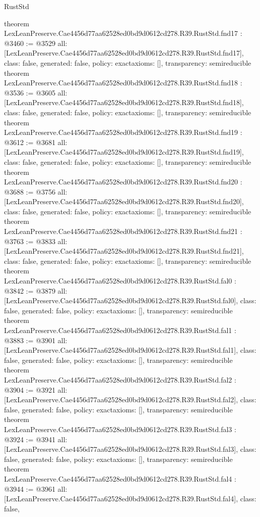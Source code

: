\begin{lexlean}{RustStd}
\begin{coremodule}
theorem LexLeanPreserve.Cae4456d77aa62528ed0bd9d0612cd278.R39.RustStd.fnd17 : @3460 := @3529 {
  all: [LexLeanPreserve.Cae4456d77aa62528ed0bd9d0612cd278.R39.RustStd.fnd17],
  class: false,
  generated: false,
  policy: exact{axioms: []},
  transparency: semireducible
}
theorem LexLeanPreserve.Cae4456d77aa62528ed0bd9d0612cd278.R39.RustStd.fnd18 : @3536 := @3605 {
  all: [LexLeanPreserve.Cae4456d77aa62528ed0bd9d0612cd278.R39.RustStd.fnd18],
  class: false,
  generated: false,
  policy: exact{axioms: []},
  transparency: semireducible
}
theorem LexLeanPreserve.Cae4456d77aa62528ed0bd9d0612cd278.R39.RustStd.fnd19 : @3612 := @3681 {
  all: [LexLeanPreserve.Cae4456d77aa62528ed0bd9d0612cd278.R39.RustStd.fnd19],
  class: false,
  generated: false,
  policy: exact{axioms: []},
  transparency: semireducible
}
theorem LexLeanPreserve.Cae4456d77aa62528ed0bd9d0612cd278.R39.RustStd.fnd20 : @3688 := @3756 {
  all: [LexLeanPreserve.Cae4456d77aa62528ed0bd9d0612cd278.R39.RustStd.fnd20],
  class: false,
  generated: false,
  policy: exact{axioms: []},
  transparency: semireducible
}
theorem LexLeanPreserve.Cae4456d77aa62528ed0bd9d0612cd278.R39.RustStd.fnd21 : @3763 := @3833 {
  all: [LexLeanPreserve.Cae4456d77aa62528ed0bd9d0612cd278.R39.RustStd.fnd21],
  class: false,
  generated: false,
  policy: exact{axioms: []},
  transparency: semireducible
}
theorem LexLeanPreserve.Cae4456d77aa62528ed0bd9d0612cd278.R39.RustStd.fal0 : @3842 := @3879 {
  all: [LexLeanPreserve.Cae4456d77aa62528ed0bd9d0612cd278.R39.RustStd.fal0],
  class: false,
  generated: false,
  policy: exact{axioms: []},
  transparency: semireducible
}
theorem LexLeanPreserve.Cae4456d77aa62528ed0bd9d0612cd278.R39.RustStd.fal1 : @3883 := @3901 {
  all: [LexLeanPreserve.Cae4456d77aa62528ed0bd9d0612cd278.R39.RustStd.fal1],
  class: false,
  generated: false,
  policy: exact{axioms: []},
  transparency: semireducible
}
theorem LexLeanPreserve.Cae4456d77aa62528ed0bd9d0612cd278.R39.RustStd.fal2 : @3904 := @3921 {
  all: [LexLeanPreserve.Cae4456d77aa62528ed0bd9d0612cd278.R39.RustStd.fal2],
  class: false,
  generated: false,
  policy: exact{axioms: []},
  transparency: semireducible
}
theorem LexLeanPreserve.Cae4456d77aa62528ed0bd9d0612cd278.R39.RustStd.fal3 : @3924 := @3941 {
  all: [LexLeanPreserve.Cae4456d77aa62528ed0bd9d0612cd278.R39.RustStd.fal3],
  class: false,
  generated: false,
  policy: exact{axioms: []},
  transparency: semireducible
}
theorem LexLeanPreserve.Cae4456d77aa62528ed0bd9d0612cd278.R39.RustStd.fal4 : @3944 := @3961 {
  all: [LexLeanPreserve.Cae4456d77aa62528ed0bd9d0612cd278.R39.RustStd.fal4],
  class: false,
}
\end{coremodule}
\end{lexlean}
